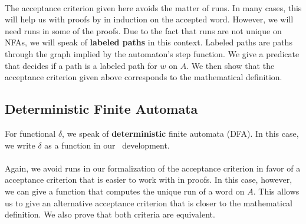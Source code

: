 \paragraph{}
The acceptance criterion given here avoids the matter of runs.
In many cases, this will help us with proofs by in induction on the accepted word.
However, we will need runs in some of the proofs.
Due to the fact that runs are not unique on NFAs, 
we will speak of \textbf{labeled paths} in this context.
Labeled paths are paths through the graph implied by the automaton's step function.
We give a predicate that decides if a path is a labeled path for $w$ on $A$.
We then show that the acceptance criterion given above corresponds to the mathematical definition.


\subsection{Deterministic Finite Automata}
For functional $\delta$, we speak of \textbf{deterministic} finite automata (DFA). 
In this case, we write $\delta$ as a function in our \coq\ development. 


\paragraph{}
Again, we avoid runs in our formalization of the acceptance criterion in favor of a acceptance criterion that is easier to work with in proofs.
In this case, however, we can give a function that computes the unique run of a word on $A$.
This allows us to give an alternative acceptance criterion that is closer to the mathematical definition.
We also prove that both criteria are equivalent.




